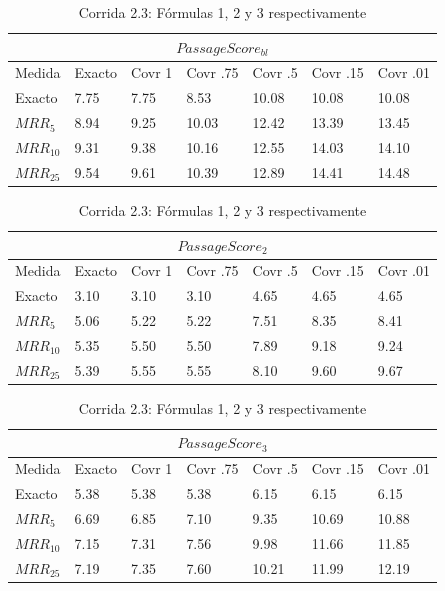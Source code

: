 \begin{table}
\centering
\begin{center}

\begin{tabular}{|l | l | l | l | l | l | l |}
\hline
\multicolumn{7}{|c|}{$PassageScore_{bl}$}  \\ \hline
Medida & Exacto & Covr 1 & Covr .75 & Covr .5 & Covr .15 & Covr .01 \\ \hline
Exacto & 7.75 & 7.75 & 8.53 & 10.08 & 10.08 & 10.08  \\ \hline
$MRR_{5}$ & 8.94 & 9.25 & 10.03 & 12.42 & 13.39 & 13.45  \\ \hline
$MRR_{10}$ & 9.31 & 9.38 & 10.16 & 12.55 & 14.03 & 14.10  \\ \hline
$MRR_{25}$ & 9.54 & 9.61 & 10.39 & 12.89 & 14.41 & 14.48  \\ \hline
\end{tabular}

\medskip

\begin{tabular}{|l | l | l | l | l | l | l |}
\hline
\multicolumn{7}{|c|}{$PassageScore_2$}  \\ \hline
Medida & Exacto & Covr 1 & Covr .75 & Covr .5 & Covr .15 & Covr .01 \\ \hline
Exacto & 3.10 & 3.10 & 3.10 & 4.65 & 4.65 & 4.65  \\ \hline
$MRR_{5}$ & 5.06 & 5.22 & 5.22 & 7.51 & 8.35 & 8.41  \\ \hline
$MRR_{10}$ & 5.35 & 5.50 & 5.50 & 7.89 & 9.18 & 9.24  \\ \hline
$MRR_{25}$ & 5.39 & 5.55 & 5.55 & 8.10 & 9.60 & 9.67  \\ \hline
\end{tabular}


\medskip


\begin{tabular}{|l | l | l | l | l | l | l |}
\hline
\multicolumn{7}{|c|}{$PassageScore_3$}  \\ \hline
Medida & Exacto & Covr 1 & Covr .75 & Covr .5 & Covr .15 & Covr .01 \\ \hline
Exacto & 5.38 & 5.38 & 5.38 & 6.15 & 6.15 & 6.15  \\ \hline
$MRR_{5}$ & 6.69 & 6.85 & 7.10 & 9.35 & 10.69 & 10.88  \\ \hline
$MRR_{10}$ & 7.15 & 7.31 & 7.56 & 9.98 & 11.66 & 11.85  \\ \hline
$MRR_{25}$ & 7.19 & 7.35 & 7.60 & 10.21 & 11.99 & 12.19  \\ \hline
\end{tabular}


\caption{Corrida 2.3: Fórmulas 1, 2 y 3 respectivamente}
\label{table:2_3_40_getExactMRRWikiFactoid_getCovrMRRWikiFactoidq}
\end{center}
\end{table}



